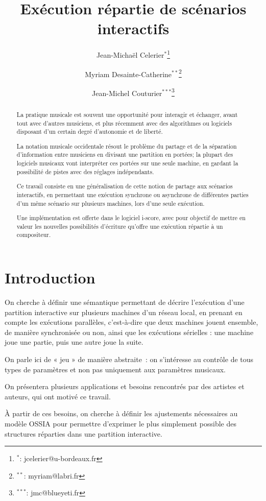 \documentclass[10pt]{article}
\title{Exécution répartie de scénarios interactifs}
\author[1,2]{Jean-Michaël Celerier$^*$\thanks{$^*$: jcelerier@u-bordeaux.fr}}
\author[1]{Myriam Desainte-Catherine$^{**}$\thanks{$^{**}$: myriam@labri.fr}}
\author[2]{Jean-Michel Couturier$^{***}$\thanks{$^{***}$: jmc@blueyeti.fr}}
\affil[1]{Univ. Bordeaux, LaBRI, UMR 5800, F-33400 Talence, France}
\affil[2]{ Blue Yeti, F-17110 France}
\newcommand\ossia{OSSIA\xspace}
\begin{document}
\maketitle
\begin{abstract}
    La pratique musicale est souvent une opportunité pour interagir et échanger, 
    avant tout avec d'autres musiciens, et plus récemment avec des algorithmes ou logiciels 
    disposant d'un certain degré d'autonomie et de liberté.
    
    La notation musicale occidentale résout le problème du partage et de la séparation d'information entre musiciens 
    en divisant une partition en portées; la plupart des logiciels musicaux vont interpréter ces portées sur une seule machine, en gardant la possibilité de pistes avec des réglages indépendants. 
    
    Ce travail consiste en une généralisation de cette notion de partage aux scénarios interactifs, en permettant une exécution synchrone ou asynchrone de différentes parties d'un même scénario sur plusieurs machines, lors d'une seule exécution.
    
    Une implémentation est offerte dans le logiciel i-score, avec pour objectif de mettre en valeur 
    les nouvelles possibilités d'écriture qu'offre une exécution répartie à un compositeur.
\end{abstract}

\section{Introduction}
On cherche à définir une sémantique permettant de décrire l'exécution d'une partition interactive sur plusieurs machines d'un réseau local, en prenant en compte les exécutions parallèles, c'est-à-dire que deux machines jouent ensemble, de manière synchronisée ou non, ainsi que les exécutions sérielles : une machine joue une partie, puis une autre joue la suite.

On parle ici de « jeu » de manière abstraite~: on s'intéresse au contrôle de tous types de paramètres et non pas uniquement aux paramètres musicaux.

On présentera plusieurs applications et besoins rencontrés par des artistes et auteurs, qui ont motivé ce travail.

À partir de ces besoins, on cherche à définir les ajustements nécessaires au modèle \ossia pour permettre d'exprimer le plus simplement possible des structures réparties dans une partition interactive.
\end{document}
